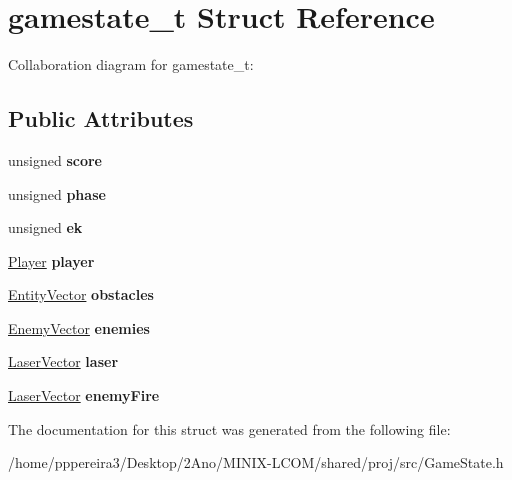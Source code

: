 \hypertarget{structgamestate__t}{}\section{gamestate\+\_\+t Struct Reference}
\label{structgamestate__t}


Collaboration diagram for gamestate\+\_\+t\+:
\subsection*{Public Attributes}
\begin{DoxyCompactItemize}
\item 
unsigned {\bfseries score}
\item 
unsigned {\bfseries phase}
\item 
unsigned {\bfseries ek}
\item 
\hyperlink{structplayer__t}{Player} {\bfseries player}
\item 
\hyperlink{structentityVector}{Entity\+Vector} {\bfseries obstacles}
\item 
\hyperlink{structenemyVector}{Enemy\+Vector} {\bfseries enemies}
\item 
\hyperlink{structlaserVector}{Laser\+Vector} {\bfseries laser}
\item 
\hyperlink{structlaserVector}{Laser\+Vector} {\bfseries enemy\+Fire}
\end{DoxyCompactItemize}


The documentation for this struct was generated from the following file\+:\begin{DoxyCompactItemize}
\item 
/home/pppereira3/\+Desktop/2\+Ano/\+M\+I\+N\+I\+X-\/\+L\+C\+O\+M/shared/proj/src/Game\+State.\+h\end{DoxyCompactItemize}
